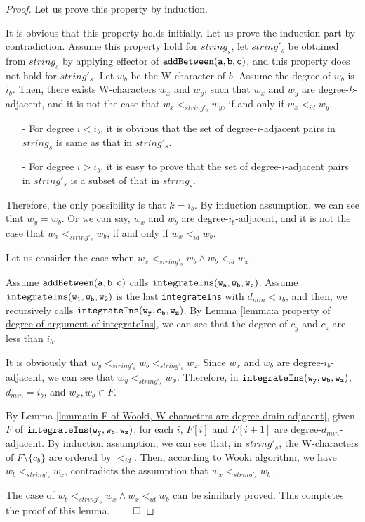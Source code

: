 \begin {proof}
Let us prove this property by induction.

It is obvious that this property holds initially. Let us prove the induction part by contradiction. Assume this property hold for $string_s$, let $string'_s$ be obtained from $string_s$ by applying effector of $\alabelshort[{\tt addBetween}]{a,b,c}$, and this property does not hold for $string'_s$. Let $w_b$ be the W-character of $b$. Assume the degree of $w_b$ is $i_b$. Then, there exists W-characters $w_x$ and $w_y$, such that $w_x$ and $w_y$ are degree-$k$-adjacent, and it is not the case that $w_x <_{string'_s} w_y$, if and only if $w_x <_{id} w_y$.

\begin{itemize}
\setlength{\itemsep}{0.5pt}
\item[-] For degree $i<i_b$, it is obvious that the set of degree-$i$-adjacent pairs in $string_s$ is same as that in $string'_s$.

\item[-] For degree $i>i_b$, it is easy to prove that the set of degree-$i$-adjacent pairs in $string'_s$ is a subset of that in $string_s$.
\end{itemize}

Therefore, the only possibility is that $k=i_b$. By induction assumption, we can see that $w_y = w_b$. Or we can say, $w_x$ and $w_b$ are degree-$i_b$-adjacent, and it is not the case that $w_x <_{string'_s} w_b$, if and only if $w_x <_{id} w_b$.

Let us consider the case when $w_x <_{string'_s} w_b \wedge w_b <_{id} w_x$.

Assume $\alabelshort[{\tt addBetween}]{a,b,c}$ calls $\alabelshort[{\tt integrateIns}]{w_a,w_b,w_c}$. Assume $\alabelshort[{\tt integrateIns}]{w_1,w_b,w_2}$ is the last {\tt integrateIns} with $d_{min} < i_b$, and then, we recursively calls $\alabelshort[{\tt integrateIns}]{w_y,c_b,w_z}$. By Lemma \ref{lemma:a property of degree of argument of integrateIns}, we can see that the degree of $c_y$ and $c_z$ are less than $i_b$.

It is obviously that $w_y <_{string'_s} w_b <_{string'_s} w_z$. Since $w_x$ and $w_b$ are degree-$i_b$-adjacent, we can see that $w_y <_{string'_s} w_x$. Therefore, in $\alabelshort[{\tt integrateIns}]{w_y,w_b,w_z}$, $d_{min} = i_b$, and $w_x,w_b \in F$.

By Lemma \ref{lemma:in F of Wooki, W-characters are degree-dmin-adjacent}, given $F$ of $\alabelshort[{\tt integrateIns}]{w_y,w_b,w_z}$, for each $i$, $F[i]$ and $F[i+1]$ are degree-$d_{min}$-adjacent. By induction assumption, we can see that, in $string'_s$, the W-characters of $F \setminus \{ c_b \}$ are ordered by $<_{id}$. Then, according to Wooki algorithm, we have $w_b <_{string'_s} w_x$, contradicts the assumption that $w_x <_{string'_s} w_b$.

The case of $w_b <_{string'_s} w_x \wedge w_x <_{id} w_b$ can be similarly proved. This completes the proof of this lemma. $\qed$
\end {proof}


